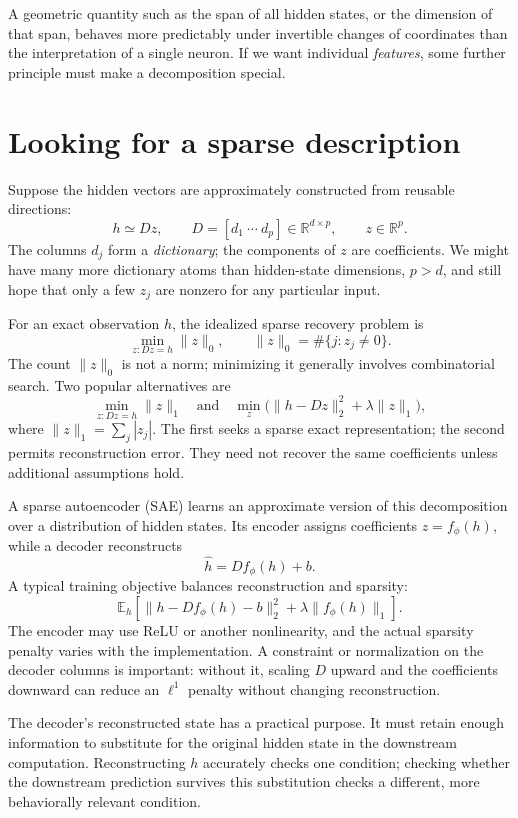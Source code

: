 A geometric quantity such as the span of all hidden states, or the dimension of that span, behaves more predictably under invertible changes of coordinates than the interpretation of a single neuron. If we want individual \emph{features}, some further principle must make a decomposition special.

\section{Looking for a sparse description}

Suppose the hidden vectors are approximately constructed from reusable directions:
\begin{equation}
 h\simeq Dz,\qquad
 D=[d_1\ \cdots\ d_p]\in\mathbb R^{d\times p},
 \qquad z\in\mathbb R^p.
 \label{eq:N20261009-dictionary}
\end{equation}
The columns \(d_j\) form a \emph{dictionary}; the components of \(z\) are coefficients. We might have many more dictionary atoms than hidden-state dimensions, \(p>d\), and still hope that only a few \(z_j\) are nonzero for any particular input.

For an exact observation \(h\), the idealized sparse recovery problem is
\[
 \min_{z:Dz=h}\|z\|_0,
 \qquad \|z\|_0=\#\{j:z_j\ne0\}.
\]
The count \(\|z\|_0\) is not a norm; minimizing it generally involves combinatorial search. Two popular alternatives are
\[
 \min_{z:Dz=h}\|z\|_1
 \quad\text{and}\quad
 \min_z\bigl(\|h-Dz\|_2^2+\lambda\|z\|_1\bigr),
 \label{eq:N20261009-l1}
\]
where \(\|z\|_1=\sum_j|z_j|\). The first seeks a sparse exact representation; the second permits reconstruction error. They need not recover the same coefficients unless additional assumptions hold.

A sparse autoencoder (SAE) learns an approximate version of this decomposition over a distribution of hidden states. Its encoder assigns coefficients \(z=f_\phi(h)\), while a decoder reconstructs
\[
 \widehat h=D f_\phi(h)+b.
\]
A typical training objective balances reconstruction and sparsity:
\[
 \mathbb E_h\!\left[
 \|h-Df_\phi(h)-b\|_2^2
 +\lambda\|f_\phi(h)\|_1\right].
\]
The encoder may use ReLU or another nonlinearity, and the actual sparsity penalty varies with the implementation. A constraint or normalization on the decoder columns is important: without it, scaling \(D\) upward and the coefficients downward can reduce an \(\ell^1\) penalty without changing reconstruction.

The decoder's reconstructed state has a practical purpose. It must retain enough information to substitute for the original hidden state in the downstream computation. Reconstructing \(h\) accurately checks one condition; checking whether the downstream prediction survives this substitution checks a different, more behaviorally relevant condition.

